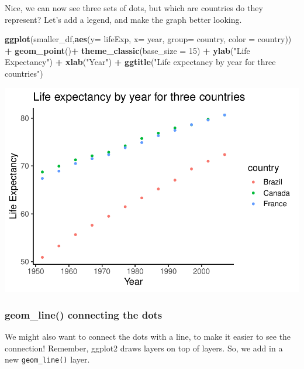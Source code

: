\documentclass[]{book}
\newenvironment{Shaded}{\begin{snugshade}}{\end{snugshade}}
\newcommand{\KeywordTok}[1]{\textcolor[rgb]{0.13,0.29,0.53}{\textbf{#1}}}
\newcommand{\DataTypeTok}[1]{\textcolor[rgb]{0.13,0.29,0.53}{#1}}
\newcommand{\DecValTok}[1]{\textcolor[rgb]{0.00,0.00,0.81}{#1}}
\newcommand{\StringTok}[1]{\textcolor[rgb]{0.31,0.60,0.02}{#1}}
\newcommand{\OperatorTok}[1]{\textcolor[rgb]{0.81,0.36,0.00}{\textbf{#1}}}
\newcommand{\NormalTok}[1]{#1}
\begin{document}
Nice, we can now see three sets of dots, but which are countries do they
represent? Let's add a legend, and make the graph better looking.

\begin{Shaded}
\begin{Highlighting}[]
\KeywordTok{ggplot}\NormalTok{(smaller_df,}\KeywordTok{aes}\NormalTok{(}\DataTypeTok{y=}\NormalTok{ lifeExp, }\DataTypeTok{x=}\NormalTok{ year, }
                      \DataTypeTok{group=}\NormalTok{ country, }\DataTypeTok{color =}\NormalTok{ country)) }\OperatorTok{+}
\StringTok{  }\KeywordTok{geom_point}\NormalTok{()}\OperatorTok{+}\StringTok{ }
\StringTok{  }\KeywordTok{theme_classic}\NormalTok{(}\DataTypeTok{base_size =} \DecValTok{15}\NormalTok{) }\OperatorTok{+}
\StringTok{  }\KeywordTok{ylab}\NormalTok{(}\StringTok{"Life Expectancy"}\NormalTok{) }\OperatorTok{+}\StringTok{ }
\StringTok{  }\KeywordTok{xlab}\NormalTok{(}\StringTok{"Year"}\NormalTok{) }\OperatorTok{+}
\StringTok{  }\KeywordTok{ggtitle}\NormalTok{(}\StringTok{"Life expectancy by year for three countries"}\NormalTok{)}
\end{Highlighting}
\end{Shaded}

\includegraphics{Statistics_Lab_files/figure-latex/1scatterD-1.pdf}

\subsubsection{geom\_line() connecting the
dots}\label{geom_line-connecting-the-dots}

We might also want to connect the dots with a line, to make it easier to
see the connection! Remember, ggplot2 draws layers on top of layers. So,
we add in a new \texttt{geom\_line()} layer.
\end{document}
